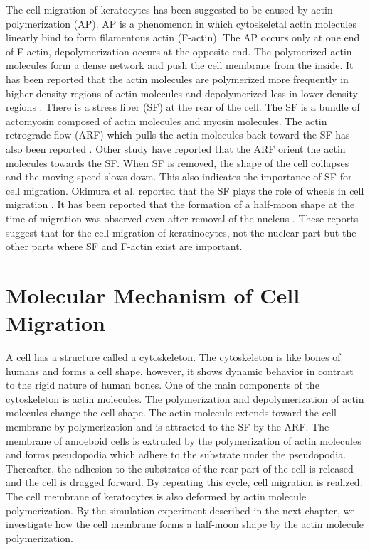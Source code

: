 \documentclass[a4paper,12pt, oneside]{book}
\begin{document}
The cell migration of keratocytes has been suggested to be caused by actin polymerization (AP)\cite{svitkina1997analysis}.
AP is a phenomenon in which cytoskeletal actin molecules linearly bind to form filamentous actin (F-actin).
The AP occurs only at one end of F-actin, depolymerization occurs at the opposite end.
The polymerized actin molecules form a dense network and push the cell membrane from the inside.
It has been reported that the actin molecules are polymerized more frequently in higher density regions of actin molecules and depolymerized less in lower density regions \cite{yumura1998spatiotemporal}.
There is a stress fiber (SF) at the rear of the cell.
The SF is a bundle of actomyosin composed of actin molecules and myosin molecules.
The actin retrograde flow (ARF) which pulls the actin molecules back toward the SF has also been reported \cite{swaminathan2017actin}.
Other study have reported that the ARF  orient the actin molecules towards the SF\cite{nakata2016role}.
When SF is removed, the shape of the cell collapses and the moving speed slows down.
This also indicates the importance of SF for cell migration.
Okimura et al. reported that the SF plays the role of wheels in cell migration \cite{okimura2018rotation}.
It has been reported that the formation of a half-moon shape at the time of migration was observed even after removal of the nucleus \cite{asano2004keratocyte}.
These reports suggest that for the cell migration of keratinocytes, not the nuclear part but the other parts where SF and F-actin exist are important.

\section{Molecular Mechanism of Cell Migration}
A cell has a structure called a cytoskeleton.
The cytoskeleton is like bones of humans and forms a cell shape, however, it shows dynamic behavior  in contrast to the rigid nature of human bones.
One of the  main components of the cytoskeleton is actin molecules.
The polymerization and depolymerization of actin molecules change the cell shape.
The actin molecule extends toward the cell membrane by polymerization and is attracted to the SF by the ARF.
The membrane of amoeboid cells is extruded by the polymerization of actin molecules and forms pseudopodia which adhere to the substrate under the pseudopodia.
Thereafter, the adhesion to the substrates of the rear part of the cell is released and the cell is dragged forward.
By repeating this cycle, cell migration is realized.
The cell membrane of keratocytes is also deformed by actin molecule polymerization.
By the simulation experiment described in the next chapter, we investigate how the cell membrane forms a half-moon shape by the actin molecule polymerization. 
\end{document}

